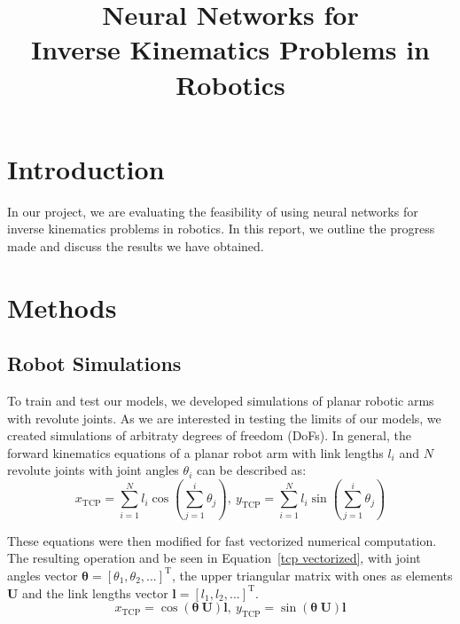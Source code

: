 \documentclass[conference]{IEEEtran}
\begin{document}
\title{Neural Networks for \\Inverse Kinematics Problems in Robotics}

\author{
    \and
}

\maketitle

\section*{Introduction}

In our project, we are evaluating the feasibility of using neural networks for inverse kinematics problems in robotics. In this report, we outline the progress made and discuss the results we have obtained.

\section*{Methods}
\subsection*{Robot Simulations}

To train and test our models, we developed simulations of planar robotic arms with revolute joints. As we are interested in testing the limits of our models, we created simulations of arbitraty degrees of freedom (DoFs). In general, the forward kinematics equations of a planar robot arm with link lengths \( l_i \) and \( N \) revolute joints with joint angles \( \theta_i \) can be described as:
\begin{equation}
    x_\text{TCP} = \sum_{i=1}^{N}{l_i \cos\left( \sum_{j=1}^{i}{\theta_j} \right)}, \ 
    y_\text{TCP} = \sum_{i=1}^{N}{l_i \sin\left( \sum_{j=1}^{i}{\theta_j} \right)}
\end{equation}

These equations were then modified for fast vectorized numerical computation. The resulting operation and be seen in Equation~\ref{tcp vectorized}, with joint angles vector \( \bm{\theta} = \left[ \theta_1, \theta_2 , ... \right]^\text{T} \), the upper triangular matrix with ones as elements \( \bm{U} \) and the link lengths vector \( \bm{l} = \left[ l_1, l_2, ... \right]^\text{T} \).
\begin{equation}
    x_\text{TCP} = \cos \left( \bm{\theta}\ \bm{U} \right) \bm{l}, \ 
    y_\text{TCP} = \sin \left( \bm{\theta}\ \bm{U} \right) \bm{l}
    \label{tcp vectorized}
\end{equation}
\end{document}

